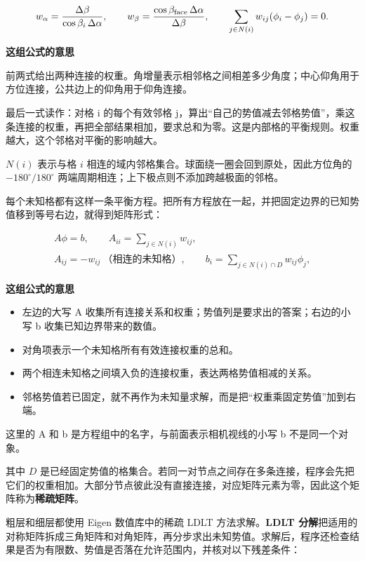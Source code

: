 \documentclass[12pt,a4paper]{article}
\numberwithin{equation}{topic}
\begin{document}
\begin{equation}
\label{eq:flux}
w_\alpha=\frac{\Delta\beta}{\cos\beta_i\,\Delta\alpha},
\qquad
w_\beta=\frac{\cos\beta_{\rm face}\,\Delta\alpha}{\Delta\beta},
\qquad
\sum_{j\in N(i)}w_{ij}(\phi_i-\phi_j)=0.
\end{equation}

\noindent\textbf{这组公式的意思}\par\nobreak
前两式给出两种连接的权重。角增量表示相邻格之间相差多少角度；中心仰角用于方位连接，公共边上的仰角用于仰角连接。

最后一式读作：对格 i 的每个有效邻格 j，算出“自己的势值减去邻格势值”，乘这条连接的权重，再把全部结果相加，要求总和为零。这是内部格的平衡规则。权重越大，这个邻格对平衡的影响越大。


\(N(i)\) 表示与格 \(i\) 相连的域内邻格集合。球面绕一圈会回到原处，因此方位角的 \(-180^\circ/180^\circ\) 两端周期相连；上下极点则不添加跨越极面的邻格。

每个未知格都有这样一条平衡方程。把所有方程放在一起，并把固定边界的已知势值移到等号右边，就得到矩阵形式：

\begin{equation}
\label{eq:matrix}
\begin{gathered}
A\phi=b,\qquad
A_{ii}=\sum_{j\in N(i)}w_{ij},\\
A_{ij}=-w_{ij}\ \text{（相连的未知格）},\qquad
b_i=\sum_{j\in N(i)\cap D}w_{ij}\phi_j,
\end{gathered}
\end{equation}

\noindent\textbf{这组公式的意思}\par\nobreak
\begin{itemize}
\item 左边的大写 A 收集所有连接关系和权重；势值列是要求出的答案；右边的小写 b 收集已知边界带来的数值。
\item 对角项表示一个未知格所有有效连接权重的总和。
\item 两个相连未知格之间填入负的连接权重，表达两格势值相减的关系。
\item 邻格势值若已固定，就不再作为未知量求解，而是把“权重乘固定势值”加到右端。
\end{itemize}
这里的 A 和 b 是方程组中的名字，与前面表示相机视线的小写 b 不是同一个对象。


其中 \(D\) 是已经固定势值的格集合。若同一对节点之间存在多条连接，程序会先把它们的权重相加。大部分节点彼此没有直接连接，对应矩阵元素为零，因此这个矩阵称为\textbf{稀疏矩阵}。

粗层和细层都使用 Eigen 数值库中的稀疏 LDLT 方法求解。\textbf{LDLT 分解}把适用的对称矩阵拆成三角矩阵和对角矩阵，再分步求出未知势值。求解后，程序还检查结果是否为有限数、势值是否落在允许范围内，并核对以下残差条件：
\end{document}

